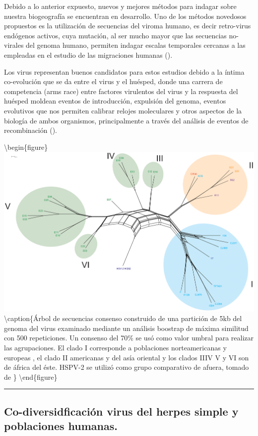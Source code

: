 \documentclass[
  12pt, krantz2,
  spanish,
]{krantz}
\begin{document}
Debido a lo anterior expuesto, nuevos y mejores métodos para indagar sobre nuestra biogeografía se encuentran en desarrollo. Uno de los métodos novedosos propuestos es la utilización de secuencias del viroma humano, es decir retro-virus endógenos activos, cuya mutación, al ser mucho mayor que las secuencias no-virales del genoma humano, permiten indagar escalas temporales cercanas a las empleadas en el estudio de las migraciones humanas (\citet{kolb2013using}).

Los virus representan buenos candidatos para estos estudios debido a la íntima co-evolución que se da entre el virus y el huésped, donde una carrera de competencia (arms race) entre factores virulentos del virus y la respuesta del huésped moldean eventos de introducción, expulsión del genoma, eventos evolutivos que nos permiten calibrar relojes moleculares y otros aspectos de la biología de ambos organismos, principalmente a través del análisis de eventos de recombinación (\citet{kolb2013using}).

\textbackslash begin\{figure\}
\includegraphics[width=0.8\linewidth]{figures/VHS1} \textbackslash caption\{Árbol de secuencias consenso construido de una partición de 5kb del genoma del virus examinado mediante un análisis boostrap de máxima similitud con 500 repeticiones. Un consenso del 70\% se usó como valor umbral para realizar las agrupaciones. El clado I corresponde a poblaciones norteamericanas y europeas , el clado II americanas y del asía oriental y los clados IIIV V y VI son de áfrica del éste. HSPV-2 se utilizó como grupo comparativo de afuera, tomado de \citet{kolb2013using}\}\label{fig:sixclades}
\textbackslash end\{figure\}

\begin{center}\rule{0.5\linewidth}{0.5pt}\end{center}

\hypertarget{co-diversidficaciuxf3n-virus-del-herpes-simple-y-poblaciones-humanas.}{%
\subsection{Co-diversidficación virus del herpes simple y poblaciones humanas.}\label{co-diversidficaciuxf3n-virus-del-herpes-simple-y-poblaciones-humanas.}}
\end{document}

